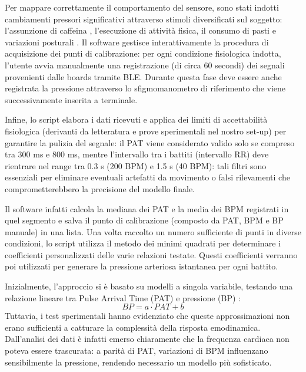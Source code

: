 \documentclass[11pt,a4paper]{article}
\begin{document}
Per mappare correttamente il comportamento del sensore, sono stati indotti cambiamenti pressori significativi attraverso stimoli diversificati \cite{Panula2023} sul soggetto: l'assunzione di caffeina \cite{Nurminen1999-vg}, l'esecuzione di attività fisica, il consumo di pasti e variazioni posturali \cite{Xie_Effects}. 
Il software gestisce interattivamente la procedura di acquisizione dei punti di calibrazione: per ogni condizione fisiologica indotta, l'utente avvia manualmente una registrazione (di circa 60 secondi) dei segnali provenienti dalle boards tramite BLE. Durante questa fase deve essere anche registrata la pressione attraverso lo sfigmomanometro di riferimento che viene successivamente inserita a terminale. 


Infine, lo script elabora i dati ricevuti e applica dei limiti di accettabilità fisiologica (derivanti da letteratura e prove sperimentali nel nostro set-up) per garantire la pulizia del segnale: il PAT viene considerato valido solo se compreso tra 300 ms e 800 ms, mentre l'intervallo tra i battiti (intervallo RR) deve rientrare nel range tra 0.3 s (200 BPM) e 1.5 s (40 BPM): tali filtri sono essenziali per eliminare eventuali artefatti da movimento o falsi rilevamenti che comprometterebbero la precisione del modello finale.


Il software infatti calcola la mediana dei PAT e la media dei BPM registrati in quel segmento e salva il punto di calibrazione (composto da PAT, BPM e BP manuale) in una lista. Una volta raccolto un numero sufficiente di punti in diverse condizioni, lo script utilizza il metodo dei minimi quadrati per determinare i coefficienti personalizzati delle varie relazioni testate. Questi coefficienti verranno poi utilizzati per generare la pressione arteriosa istantanea per ogni battito.


Inizialmente, l'approccio si è basato su modelli a singola variabile, testando una relazione lineare tra Pulse Arrival Time (PAT) e pressione (BP) \cite{lazazzera2019}:
\begin{equation}
    BP = a \cdot PAT + b
\end{equation}
Tuttavia, i test sperimentali hanno evidenziato che queste approssimazioni non erano sufficienti a catturare la complessità della risposta emodinamica. Dall'analisi dei dati è infatti emerso chiaramente che la frequenza cardiaca non poteva essere trascurata: a parità di PAT, variazioni di BPM influenzano sensibilmente la pressione, rendendo necessario un modello più sofisticato.
\end{document}

